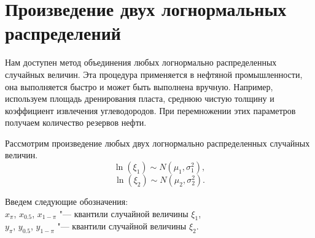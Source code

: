 \documentclass[12pt]{article}
\begin{document}
	\section{Произведение двух логнормальных распределений}
	Нам доступен метод объединения любых логнормально распределенных случайных величин. Эта процедура применяется в нефтяной промышленности, она выполняется быстро и может быть выполнена вручную. Например, используем площадь дренирования пласта, среднюю чистую толщину и коэффициент извлечения углеводородов. При перемножении этих параметров получаем количество резервов нефти.
	
	Рассмотрим произведение любых двух логнормально распределенных случайных величин.
	\begin{equation*}
		\ln(\xi_{1}) \sim N(\mu_{1}, \sigma _{1}^{2}),
	\end{equation*}
	\begin{equation*}
		\ln(\xi_{2}) \sim N(\mu_{2}, \sigma _{2}^{2}).
	\end{equation*}
	
	Введем следующие обозначения:\\
	$x_{\pi}$, $x_{0.5}$, $x_{1-\pi}$ "--- квантили случайной величины $\xi_{1}$,\\
	$y_{\pi}$, $y_{0.5}$, $y_{1-\pi}$ "--- квантили случайной величины $\xi_{2}$.
	
\end{document}
